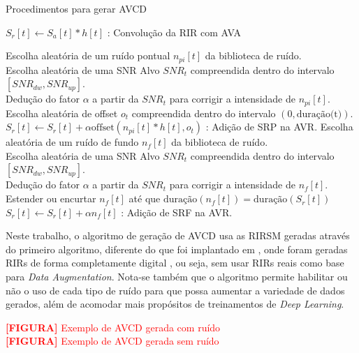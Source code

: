 \begin{algorithm} [H] 
    \caption{Procedimentos para gerar AVCD}
    \label{alg:AVCD-gen}


    $S_r[t] \gets S_a[t] \ast h[t]$ : Convolução da RIR com AVA

    {
        {
            Escolha aleatória de um ruído pontual $n_{pi}[t]$ da biblioteca de ruído. \\
            Escolha aleatória de uma SNR Alvo $SNR_t$ compreendida dentro do intervalo $[SNR_{dw},SNR_{up}]$. \\
            Dedução do fator $\alpha$ a partir da $SNR_t$ para corrigir a intensidade de $n_{pi}[t]$. \\
            Escolha aleatória de offset $o_t$ compreendida dentro do intervalo $(0,\text{duração(t)})$. \\
            $S_r[t] \gets S_r[t] + \alpha \text{offset}(n_{pi}[t] \ast h[t], o_t)$ : Adição de SRP na AVR.
        }
    }
    {
        Escolha aleatória de um ruído de fundo $n_f[t]$ da biblioteca de ruído. \\
        Escolha aleatória de uma SNR Alvo $SNR_t$ compreendida dentro do intervalo $[SNR_{dw},SNR_{up}]$. \\
        Dedução do fator $\alpha$ a partir da $SNR_t$ para corrigir a intensidade de $n_f[t]$. \\
        Estender ou encurtar $n_f[t]$ até que $\text{duração}(n_f[t]) = \text{duração}(S_r[t])$
        $S_r[t] \gets S_r[t] + \alpha n_f[t]$ : Adição de SRF na AVR.
    }

\end{algorithm}
\pagebreak


Neste trabalho, o algoritmo de geração de AVCD usa as RIRSM geradas através do primeiro algoritmo, diferente do que foi implantado
em \cite{Speech_Rec}, onde foram geradas RIRs de forma completamente digital \cite{RIR_sim_image}, ou seja, sem usar RIRs reais 
como base para \textit{Data Augmentation}.
Nota-se também que o algoritmo permite habilitar ou não o uso de cada tipo de ruído para que possa aumentar a variedade de dados gerados, além
de acomodar mais propósitos de treinamentos de \textit{Deep Learning}.


\noindent
\textcolor{red}{\textbf{[FIGURA]} Exemplo de AVCD gerada com ruído} \\ 
\textcolor{red}{\textbf{[FIGURA]} Exemplo de AVCD gerada sem ruído} 